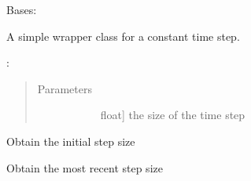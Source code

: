 \documentclass[letterpaper,10pt,english]{sphinxmanual}
\begin{document}
\begin{fulllineitems}
\label{\detokenize{spitfire.time.stepcontrol:spitfire.time.stepcontrol.ConstantTimeStep}}
Bases: 

A simple wrapper class for a constant time step.

:
\begin{quote}\begin{description}
\item[{Parameters}] \leavevmode\begin{description}
\item[{}] \leavevmode{[}float{]}
the size of the time step

\end{description}

\end{description}\end{quote}

\begin{fulllineitems}
\label{\detokenize{spitfire.time.stepcontrol:spitfire.time.stepcontrol.ConstantTimeStep.first_step_size}}
Obtain the initial step size

\end{fulllineitems}


\begin{fulllineitems}
\label{\detokenize{spitfire.time.stepcontrol:spitfire.time.stepcontrol.ConstantTimeStep.last_step_size}}
Obtain the most recent step size

\end{fulllineitems}



\end{fulllineitems}
\end{document}
